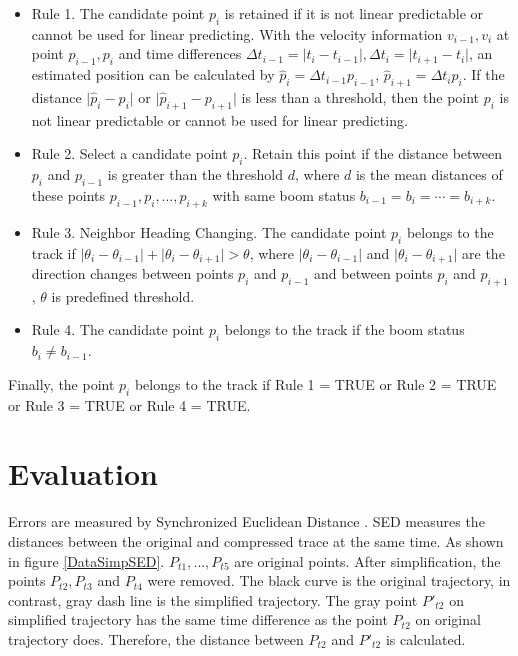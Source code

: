 \begin{itemize}
\item Rule 1. The candidate point $p_i$ is retained if it is not linear predictable or cannot be used for linear predicting. With the velocity information $v_{i-1}, v_i$ at point $p_{i-1}, p_i$ and time differences $\Delta t_{i-1} = \lvert t_{i}-t_{i-1} \rvert,\Delta t_{i} = \lvert t_{i+1}-t_{i}\rvert$, an estimated position can be calculated by $\hat{p}_i=\Delta t_{i-1} p_{i-1}$, $\hat{p}_{i+1}=\Delta t_{i} p_{i}$. If the distance $\lvert \hat{p}_i-p_i\rvert$ or $\lvert \hat{p}_{i+1}-p_{i+1}\rvert$ is less than a threshold, then the point $p_i$ is not linear predictable or cannot be used for linear predicting.

\item Rule 2. Select a candidate point $p_i$. Retain this point if the distance between $p_i$ and $p_{i-1}$ is greater than the threshold $d$, where $d$ is the mean distances of these points $p_{i-1}, p_i, \ldots, p_{i+k}$ with same boom status $b_{i-1}=b_i=\cdots=b_{i+k}$. 

\item Rule 3. Neighbor Heading Changing. The candidate point $p_i$ belongs to the track if $\lvert \theta_i-\theta_{i-1}\rvert  + \lvert \theta_i-\theta_{i+1}\rvert >\theta$, where $\lvert \theta_i-\theta_{i-1}\rvert$ and $ \lvert \theta_i-\theta_{i+1}\rvert $ are the direction changes between points $p_i$ and $p_{i-1}$ and between points $p_i$ and $p_{i+1}$, $\theta$ is predefined threshold.

\item Rule 4. The candidate point $p_i$ belongs to the track if the boom status $b_i\neq b_{i-1}$.
\end{itemize}

Finally, the point $p_i$ belongs to the track if Rule 1 = TRUE or Rule 2 = TRUE or Rule 3 = TRUE or Rule 4 = TRUE.


\section{Evaluation}

Errors are measured by Synchronized Euclidean Distance \cite{lawson2011compression}. SED measures the distances between the original and compressed trace at the same time. As shown in figure \ref{DataSimpSED}. $P_{t1}, \ldots ,P_{t5}$ are original points. After simplification, the points $P_{t2}, P_{t3}$ and $P_{t4}$ were removed. The black curve is the original trajectory, in contrast, gray dash line is the simplified trajectory. The gray point $P'_{t2}$ on simplified trajectory has the same time difference as the point $P_{t2}$ on original trajectory does. Therefore, the distance between $P_{t2}$ and $P'_{t2}$ is calculated.


